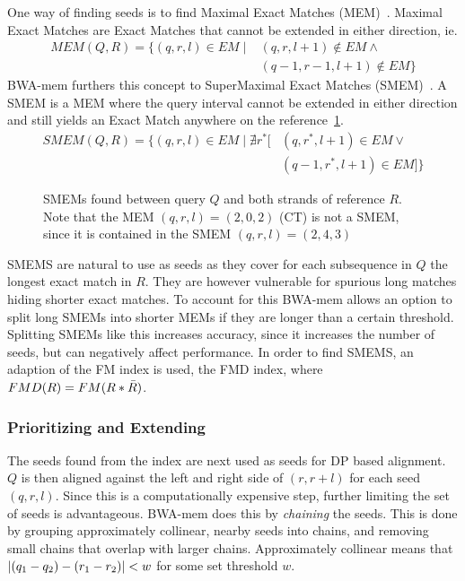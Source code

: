 One way of finding seeds is to find Maximal Exact Matches (MEM)~\cite{longmem, origmem}.
Maximal Exact Matches are Exact Matches that cannot be extended in either direction, ie. 
\begin{align*}
  MEM(Q, R) = \{(q, r, l) \in EM \mid &(q, r, l+1) \notin EM \wedge \\
  & (q-1, r-1, l+1) \notin EM \}
\end{align*}
BWA-mem furthers this concept to SuperMaximal Exact Matches (SMEM)~\cite{origsmem}.
A SMEM is a MEM where the query interval cannot be extended in either direction and still yields an Exact Match anywhere on the reference~\ref{fig:smem}.
\begin{align*}
  SMEM(Q, R) = \{(q, r, l) \in EM \mid \nexists r^*[&(q, r^*, l+1) \in EM \vee\\
    &(q-1, r^*, l+1) \in EM] \}
\end{align*}
\begin{figure}
  \tikzpicture
  
  \endtikzpicture
  \caption{SMEMs found between query $Q$ and both strands of reference $R$. Note that the MEM $(q, r, l)=(2, 0, 2)$ (CT) is not a SMEM, since it is contained in the SMEM $(q, r, l) = (2, 4, 3)$}
  \label{fig:smem}
\end{figure}

SMEMS are natural to use as seeds as they cover for each subsequence in $Q$ the longest exact match in $R$.
They are however vulnerable for spurious long matches hiding shorter exact matches.
To account for this BWA-mem allows an option to split long SMEMs into shorter MEMs if they are longer than a certain threshold.
Splitting SMEMs like this increases accuracy, since it increases the number of seeds, but can negatively affect performance. 
In order to find SMEMS, an adaption of the FM index is used, the FMD index, where $FMD(R) = FM(R * \bar{R})$.

\subsubsection{Prioritizing and Extending}
The seeds found from the index are next used as seeds for DP based alignment.
$Q$ is then aligned against the left and right side of $(r, r+l)$ for each seed $(q, r, l)$.
Since this is a computationally expensive step, further limiting the set of seeds is advantageous.
BWA-mem does this by \emph{chaining} the seeds.
This is done by grouping approximately collinear, nearby seeds into chains, and removing small chains that overlap with larger chains.
Approximately collinear means that $\left | (q_1-q_2) -(r_1-r_2) \right |<w$ for some set threshold $w$.

